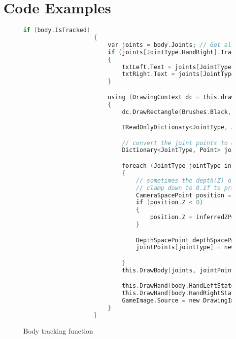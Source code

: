 \documentclass[onecolumn, draftclsnofoot,10pt, compsoc]{IEEEtran}
\begin{document}
\section{Code Examples}
\begin{figure}[h]
\begin{lstlisting}[language=C, style=customc]
if (body.IsTracked)
                    {
                        var joints = body.Joints; // Get all of the joints in that body
                        if (joints[JointType.HandRight].TrackingState == TrackingState.Tracked && joints[JointType.HandLeft].TrackingState == TrackingState.Tracked)
                        {
                            txtLeft.Text = joints[JointType.HandLeft].Position.Y.ToString();
                            txtRight.Text = joints[JointType.HandRight].Position.Y.ToString();
                        }

                        using (DrawingContext dc = this.drawingGroup.Open())
                        {
                            dc.DrawRectangle(Brushes.Black, null, new Rect(0.0, 0.0, this.displayWidth, this.displayHeight));

                            IReadOnlyDictionary<JointType, Joint> jointsD = body.Joints;

                            // convert the joint points to depth (display) space
                            Dictionary<JointType, Point> jointPoints = new Dictionary<JointType, Point>();

                            foreach (JointType jointType in jointsD.Keys)
                            {
                                // sometimes the depth(Z) of an inferred joint may show as negative
                                // clamp down to 0.1f to prevent coordinatemapper from returning (-Infinity, -Infinity)
                                CameraSpacePoint position = jointsD[jointType].Position;
                                if (position.Z < 0)
                                {
                                    position.Z = InferredZPositionClamp;
                                }

                                DepthSpacePoint depthSpacePoint = this.coordinateMapper.MapCameraPointToDepthSpace(position);
                                jointPoints[jointType] = new Point(depthSpacePoint.X, depthSpacePoint.Y);

                            }
                            this.DrawBody(joints, jointPoints, dc, drawPen);

                            this.DrawHand(body.HandLeftState, jointPoints[JointType.HandLeft], dc);
                            this.DrawHand(body.HandRightState, jointPoints[JointType.HandRight], dc);
                            GameImage.Source = new DrawingImage(drawingGroup);
                        }
                    }

\end{lstlisting}
\caption{Body tracking function}
\end{figure}
\end{document}
